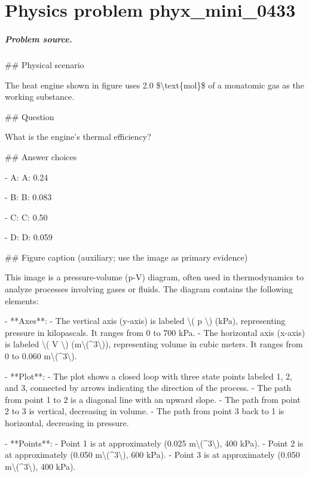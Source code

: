 
\chapter{Physics problem phyx\_mini\_0433}
\label{ch:PhyXMiniProblems_problem_phyx_mini_0433}

\paragraph{Problem source.}
\#\# Physical scenario

The heat engine shown in figure uses 2.0 \$\textbackslash{}text\{mol\}\$ of a monatomic gas as the working substance.

\#\# Question

What is the engine's thermal efficiency?

\#\# Answer choices

- A: A: 0.24

- B: B: 0.083

- C: C: 0.50

- D: D: 0.059

\#\# Figure caption (auxiliary; use the image as primary evidence)

This image is a pressure-volume (p-V) diagram, often used in thermodynamics to analyze processes involving gases or fluids. The diagram contains the following elements:

- **Axes**: 
  - The vertical axis (y-axis) is labeled \textbackslash{}( p \textbackslash{}) (kPa), representing pressure in kilopascals. It ranges from 0 to 700 kPa.
  - The horizontal axis (x-axis) is labeled \textbackslash{}( V \textbackslash{}) (m\textbackslash{}(\textasciicircum{}3\textbackslash{})), representing volume in cubic meters. It ranges from 0 to 0.060 m\textbackslash{}(\textasciicircum{}3\textbackslash{}).

- **Plot**: 
  - The plot shows a closed loop with three state points labeled 1, 2, and 3, connected by arrows indicating the direction of the process.
  - The path from point 1 to 2 is a diagonal line with an upward slope.
  - The path from point 2 to 3 is vertical, decreasing in volume.
  - The path from point 3 back to 1 is horizontal, decreasing in pressure.

- **Points**:
  - Point 1 is at approximately (0.025 m\textbackslash{}(\textasciicircum{}3\textbackslash{}), 400 kPa).
  - Point 2 is at approximately (0.050 m\textbackslash{}(\textasciicircum{}3\textbackslash{}), 600 kPa).
  - Point 3 is at approximately (0.050 m\textbackslash{}(\textasciicircum{}3\textbackslash{}), 400 kPa).

